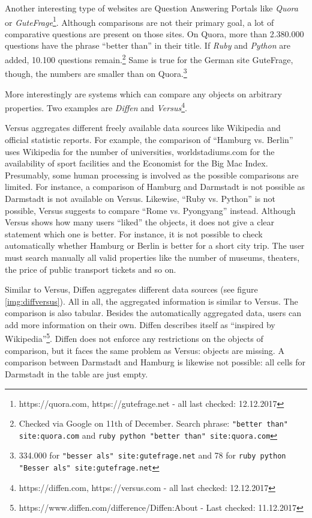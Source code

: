 Another interesting type of websites are Question Answering Portals like \emph{Quora} or \emph{GuteFrage}\footnote{https://quora.com, https://gutefrage.net - all last checked: 12.12.2017}. Although comparisons are not their primary goal, a lot of comparative questions are present on those sites.
On Quora, more than 2.380.000 questions have the phrase \enquote{better than} in their title. If \emph{Ruby} and \emph{Python} are added, 10.100 questions remain.\footnote{Checked via Google on 11th of December. Search phrase: \texttt{"better than" site:quora.com} and \texttt{ruby python "better than" site:quora.com}}
Same is true for the German site GuteFrage, though, the numbers are smaller than on Quora.\footnote{334.000 for \texttt{"besser als" site:gutefrage.net} and 78 for \texttt{ruby python "Besser als" site:gutefrage.net}}\newline

More interestingly are systems which can compare any objects on arbitrary properties. Two examples are \emph{Diffen} and \emph{Versus}\footnote{https://diffen.com, https://versus.com - all last checked: 12.12.2017}.

Versus aggregates different freely available data sources like Wikipedia and official statistic reports. For example, the comparison of \enquote{Hamburg vs. Berlin} uses Wikipedia for the number of universities, worldstadiums.com for the availability of sport facilities and the Economist for the Big Mac Index. Presumably, some human processing is involved as the possible comparisons are limited. For instance, a comparison of Hamburg and Darmstadt is not possible as Darmstadt is not available on Versus. Likewise, \enquote{Ruby vs. Python} is not possible, Versus suggests to compare \enquote{Rome vs. Pyongyang} instead. Although Versus shows how many users \enquote{liked} the objects, it does not give a clear statement which one is better. For instance, it is not possible to check automatically whether Hamburg or Berlin is better for a short city trip. The user must search manually all valid properties like the number of museums, theaters, the price of public transport tickets and so on.

Similar to Versus, Diffen aggregates different data sources (see figure \ref{img:diffversus}). All in all, the aggregated information is similar to Versus. The comparison is also tabular. Besides the automatically aggregated data, users can add more information on their own. Diffen describes itself as \enquote{inspired by Wikipedia}\footnote{https://www.diffen.com/difference/Diffen:About - Last checked: 11.12.2017}. Diffen does not enforce any restrictions on the objects of comparison, but it faces the same problem as Versus: objects are missing. A comparison between Darmstadt and Hamburg is likewise not possible: all cells for Darmstadt in the table are just empty.\newline

